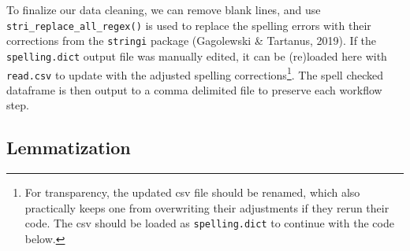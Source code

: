 \documentclass[man]{apa6}
\newenvironment{Shaded}{\begin{snugshade}}{\end{snugshade}}
\newcommand{\CommentTok}[1]{\textcolor[rgb]{0.56,0.35,0.01}{\textit{#1}}}
\newcommand{\DataTypeTok}[1]{\textcolor[rgb]{0.13,0.29,0.53}{#1}}
\newcommand{\KeywordTok}[1]{\textcolor[rgb]{0.13,0.29,0.53}{\textbf{#1}}}
\newcommand{\NormalTok}[1]{#1}
\newcommand{\OperatorTok}[1]{\textcolor[rgb]{0.81,0.36,0.00}{\textbf{#1}}}
\newcommand{\OtherTok}[1]{\textcolor[rgb]{0.56,0.35,0.01}{#1}}
\newcommand{\StringTok}[1]{\textcolor[rgb]{0.31,0.60,0.02}{#1}}
\let\rmarkdownfootnote\footnote%
\def\footnote{\protect\rmarkdownfootnote}
\begin{document}
\normalsize

To finalize our data cleaning, we can remove blank lines, and use \texttt{stri\_replace\_all\_regex()} is used to replace the spelling errors with their corrections from the \texttt{stringi} package (Gagolewski \& Tartanus, 2019). If the \texttt{spelling.dict} output file was manually edited, it can be (re)loaded here with \texttt{read.csv} to update with the adjusted spelling corrections\footnote{For transparency, the updated csv file should be renamed, which also practically keeps one from overwriting their adjustments if they rerun their code. The csv should be loaded as \texttt{spelling.dict} to continue with the code below.}. The spell checked dataframe is then output to a comma delimited file to preserve each workflow step.

\scriptsize

\begin{Shaded}
\end{Shaded}

\normalsize

\hypertarget{lemmatization}{%
\subsection{Lemmatization}\label{lemmatization}}
\end{document}
